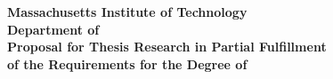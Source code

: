 \documentclass{article}
\begin{document}
\newcommand{\cut}[1]{}
%
\newcommand{\paragraphnone}[1]{\vspace{0.075in}\noindent{\bf #1}}
\newcommand{\paragrapha}[1]{\vspace{0.075in}\noindent{\bf #1.}}
\newcommand{\paragraphq}[1]{\vspace{0.075in}\noindent{\bf #1}}
%
\newcommand{\eg}{e.g., }
\newcommand{\etc}{{etc.}\xspace}
\newcommand{\ie}{i.e., }
\newcommand{\ccp}{CCP\xspace}
%
\newcommand{\datapath}{datapath\xspace}
\newcommand{\datapaths}{datapaths\xspace}
\newcommand{\Datapaths}{Datapaths\xspace}
\newcommand{\Datapath}{Datapath\xspace}
%
\frenchspacing
%
\newcommand{\handlers}{callbacks\xspace}
\newcommand{\userspace}{user-space\xspace}
\newcommand{\kernelspace}{kernel-space\xspace}
%
\newcommand{\controller}{agent\xspace}



\begin{center}
{\Large \bf 
   Massachusetts Institute of Technology
\\ Department of \deptname \\}
\vspace{.25in}
{\Large \bf
   Proposal for Thesis Research in Partial Fulfillment
\\ of the Requirements for the Degree of
\\ \degree \\}
\end{center}

\vspace{.5in}

\def\sig{{\small \sc (Signature of Author)}}

\end{document}

